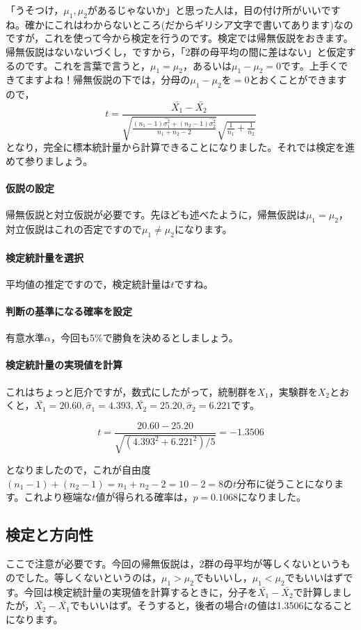 \documentclass{ltjsarticle}
\begin{document}
「うそつけ，$\mu_1,\mu_2$があるじゃないか」と思った人は，目の付け所がいいですね。確かにこれはわからないところ(だからギリシア文字で書いてあります)なのですが，これを使って今から検定を行うのです。検定では帰無仮説をおきます。帰無仮説はないないづくし，ですから，「2群の母平均の間に差はない」と仮定するのです。これを言葉で言うと，$\mu_1=\mu_2$，あるいは$\mu_1-\mu_2=0$です。上手くできてますよね！帰無仮説の下では，分母の$\mu_1-\mu_2$を$=0$とおくことができますので，
$$ t = \frac{\bar{X_1}-\bar{X_2}}{\sqrt{\frac{(n_1-1)\hat{\sigma_1^2}+(n_2-1)\hat{\sigma_2^2}}{n_1+n_2 - 2}}\sqrt{\frac{1}{n_1}+\frac{1}{n_2}}}$$
となり，完全に標本統計量から計算できることになりました。それでは検定を進めて参りましょう。
\paragraph{仮説の設定}帰無仮説と対立仮説が必要です。先ほども述べたように，帰無仮説は$\mu_1=\mu_2$，対立仮説はこれの否定ですので$\mu_1 \neq \mu_2$になります。
\paragraph{検定統計量を選択}平均値の推定ですので，検定統計量は$t$ですね。
\paragraph{判断の基準になる確率を設定}有意水準$\alpha$，今回も5\%で勝負を決めるとしましょう。
\paragraph{検定統計量の実現値を計算}これはちょっと厄介ですが，数式にしたがって，統制群を$X_1$，実験群を$X_2$とおくと，$\bar{X_1}=20.60,\hat{\sigma}_1=4.393,\bar{X_2}=25.20,\hat{\sigma}_2=6.221$です。

$$ t = \frac{20.60-25.20}{\sqrt{(4.393^2+6.221^2)/5}} = -1.3506$$

となりましたので，これが自由度$(n_1-1)+(n_2-1)=n_1+n_2-2=10-2=8$の$t$分布に従うことになります。これより極端な$t$値が得られる確率は，$p=0.1068$になりました。
\subsection{検定と方向性}
ここで注意が必要です。今回の帰無仮説は，2群の母平均が等しくないというものでした。等しくないというのは，$\mu_1>\mu_2$でもいいし，$\mu_1<\mu_2$でもいいはずです。今回は検定統計量の実現値を計算するときに，分子を$\bar{X_1}-\bar{X_2}$で計算しましたが，$\bar{X_2}-\bar{X_1}$でもいいはず。そうすると，後者の場合$t$の値は1.3506になることになります。
\end{document}
